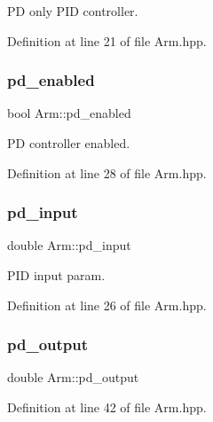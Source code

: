PD only P\+ID controller. 



Definition at line 21 of file Arm.\+hpp.

\mbox{\label{class_arm_a44b074fd8db815261bc634f914c1e0f8}} 
\subsubsection{\texorpdfstring{pd\+\_\+enabled}{pd\_enabled}}
{\footnotesize\ttfamily bool Arm\+::pd\+\_\+enabled\hspace{0.3cm}{\ttfamily [private]}}



PD controller enabled. 



Definition at line 28 of file Arm.\+hpp.

\mbox{\label{class_arm_aa8cb716ce90ab9d02f8e4ab3735904cb}} 
\subsubsection{\texorpdfstring{pd\+\_\+input}{pd\_input}}
{\footnotesize\ttfamily double Arm\+::pd\+\_\+input\hspace{0.3cm}{\ttfamily [private]}}



P\+ID input param. 



Definition at line 26 of file Arm.\+hpp.

\mbox{\label{class_arm_a75af15c369c67a1563f198e029bae1e4}} 
\subsubsection{\texorpdfstring{pd\+\_\+output}{pd\_output}}
{\footnotesize\ttfamily double Arm\+::pd\+\_\+output}



Definition at line 42 of file Arm.\+hpp.

\mbox{\label{class_arm_a1f4bd75360f1fa61330494569b08f4aa}} 
